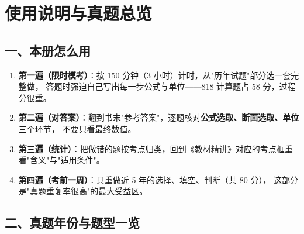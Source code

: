 \chapter*{使用说明与真题总览}

\section*{一、本册怎么用}

\begin{enumerate}
  \item \textbf{第一遍（限时模考）}：按 150 分钟（3 小时）计时，从"历年试题"部分选一套完整做，
        答题时强迫自己写出每一步公式与单位——818 计算题占 58 分，过程分很重。
  \item \textbf{第二遍（对答案）}：翻到书末"参考答案"，逐题核对\textbf{公式选取、断面选取、单位}三个环节，
        不要只看最终数值。
  \item \textbf{第三遍（统计）}：把做错的题按考点归类，回到《教材精讲》对应的考点框重看"含义"与"适用条件"。
  \item \textbf{第四遍（考前一周）}：只重做近 5 年的选择、填空、判断（共 80 分），
        这部分是"真题重复率很高"的最大受益区。
\end{enumerate}

\section*{二、真题年份与题型一览}

